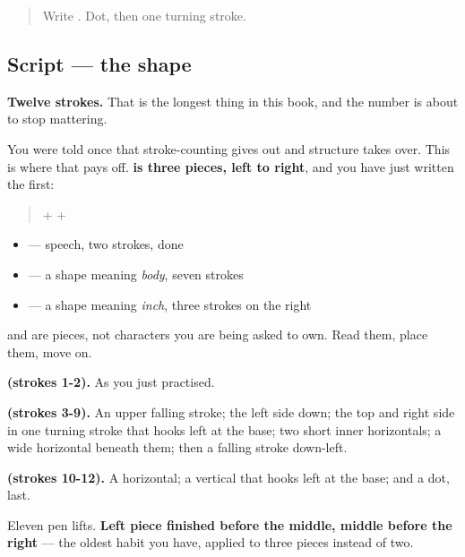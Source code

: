 \begin{quote}
Write . Dot, then one turning stroke.
\end{quote}

\subsection*{Script — the shape}

\begin{quote}
\end{quote}

\textbf{Twelve strokes.} That is the longest thing in this book, and the number is about to stop mattering.

You were told once that stroke-counting gives out and structure takes over. This is where that pays off. \textbf{ is three pieces, left to right}, and you have just written the first:

\begin{quote}
\textbf{} + \textbf{} + \textbf{}
\end{quote}

\begin{itemize}
\raggedright
  \item \textbf{} — speech, two strokes, done
  \item \textbf{} — a shape meaning \emph{body}, seven strokes
  \item \textbf{} — a shape meaning \emph{inch}, three strokes on the right
\end{itemize}

 and  are pieces, not characters you are being asked to own. Read them, place them, move on.

\textbf{ (strokes 1-2).} As you just practised.

\textbf{ (strokes 3-9).} An upper falling stroke; the left side down; the top and right side in one turning stroke that hooks left at the base; two short inner horizontals; a wide horizontal beneath them; then a falling stroke down-left.

\textbf{ (strokes 10-12).} A horizontal; a vertical that hooks left at the base; and a dot, last.

Eleven pen lifts. \textbf{Left piece finished before the middle, middle before the right} — the oldest habit you have, applied to three pieces instead of two.

